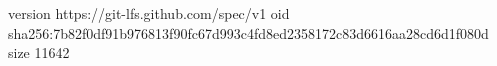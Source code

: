 version https://git-lfs.github.com/spec/v1
oid sha256:7b82f0df91b976813f90fc67d993c4fd8ed2358172c83d6616aa28cd6d1f080d
size 11642
